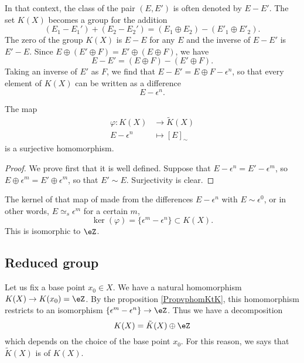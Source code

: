 In that context, the class of the pair $(E,E')$ is often denoted by $E-E'$. The set $K(X)$ becomes a group for the addition
\begin{equation}
(E_1-E_1')+(E_2-E_2')=(E_1\oplus E_2)-(E'_1\oplus E'_2).
\end{equation}
The zero of the group $K(X)$ is $E-E$ for any $E$ and the inverse of $E-E'$ is $E'-E$. Since $E\oplus(E'\oplus F)=E'\oplus(E\oplus F)$, we have
\begin{equation}
E-E'=(E\oplus F)-(E'\oplus F).
\end{equation}
Taking an inverse of $E'$ as $F$, we find that $E-E'=E\oplus F-\epsilon^n$, so that every element of $K(X)$ can be written as a difference 
\[ 
E-\epsilon^n. 
\]

\begin{proposition}		\label{PropvphomKtK}
The map
\begin{equation}
\begin{aligned}
 \varphi\colon K(X)&\to \tilde K(X) \\ 
   E-\epsilon^n&\mapsto [E]_{\sim} 
\end{aligned}
\end{equation}
is a surjective homomorphism.
\end{proposition}

\begin{proof}
We prove first that it is well defined. Suppose that $E-\epsilon^n=E'-\epsilon^m$, so $E\oplus \epsilon^m=E'\oplus \epsilon^m$, so that $E'\sim E$. Surjectivity is clear.
\end{proof}

The kernel of that map of made from the differences $E-\epsilon^n$ with $E\sim \epsilon^0$, or in other words, $E\simeq_s\epsilon^m$ for a certain $m$,
\begin{equation}
\ker(\varphi)=\{ \epsilon^m-\epsilon^n \}\subset K(X).
\end{equation}
This is isomorphic to $\eZ$.

					\subsection{Reduced group}

Let us fix a base point $x_0\in X$. We have a natural homomorphism $K(X)\to K(x_0)=\eZ$. By the proposition \ref{PropvphomKtK}, this homomorphism restricts to an isomorphism $\{ \epsilon^m-\epsilon^n \}\to \eZ$. Thus we have a decomposition
\begin{equation}
		K(X)=\tilde K(X)\oplus\eZ
\end{equation}
which depends on the choice of the base point $x_0$. For this reason, we says that $\tilde K(X)$ is  of $K(X)$.

